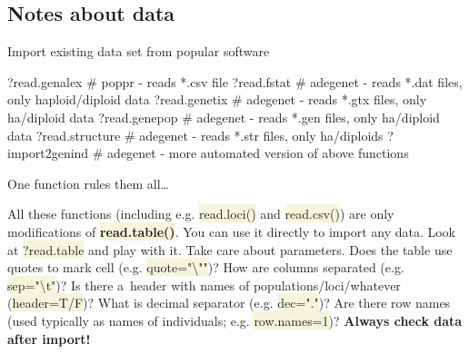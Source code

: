 \documentclass[compress, xelatex, 11pt, xcolor=svgnames, aspectratio=169,
	hyperref={
		bookmarks=true,
		unicode=true,
		colorlinks=true,
		pdftitle={Molecular data in R},
		plainpages=false,
		pdfauthor={Vojtech Zeisek},
		pdfsubject={Course about phylogeny and evolution in R},
		pdfcreator={XeLaTeX},
		pdfkeywords={R, evolution, phylogeny, molecular data},
		linkcolor=Crimson, %
		anchorcolor=Magenta, %
		citecolor=Magenta, %
		filecolor=Magenta, %
		menucolor=Magenta, %
		urlcolor=DodgerBlue, %
		},
	url={hyphens, lowtilde} %
	]{beamer}
\renewcommand{\texttt}[1]{\colorbox{Beige}{{\ttfamily #1}}}
\begin{document}
\subsection{Notes about data}

\begin{frame}[fragile]{Import existing data set from popular software}
	\begin{spluscode}
    ?read.genalex # poppr - reads *.csv file
    ?read.fstat # adegenet - reads *.dat files, only haploid/diploid data
    ?read.genetix # adegenet - reads *.gtx files, only ha/diploid data
    ?read.genepop # adegenet - reads *.gen files, only ha/diploid data
    ?read.structure # adegenet - reads *.str files, only ha/diploids
    ?import2genind # adegenet - more automated version of above functions
	\end{spluscode}
	\begin{alertblock}{One function rules them all\ldots}
		\begin{footnotesize}
			All these functions (including e.g. \texttt{read.loci()} and \texttt{read.csv()}) are only modifications of \textbf{\texttt{read.table()}}. You can use it directly to import any data. Look at \texttt{?read.table} and play with it. Take care about parameters. Does the table use quotes to mark cell (e.g. \texttt{quote="\textbackslash ""})? How are columns separated (e.g. \texttt{sep="\textbackslash t"})? Is there a~header with names of populations/loci/whatever (\texttt{header=T/F})? What is decimal separator (e.g. \texttt{dec="."})? Are there row names (used typically as names of individuals; e.g. \texttt{row.names=1})? \alert{\textbf{Always check data after import!}}
		\end{footnotesize}
	\end{alertblock}
\end{frame}
\end{document}
